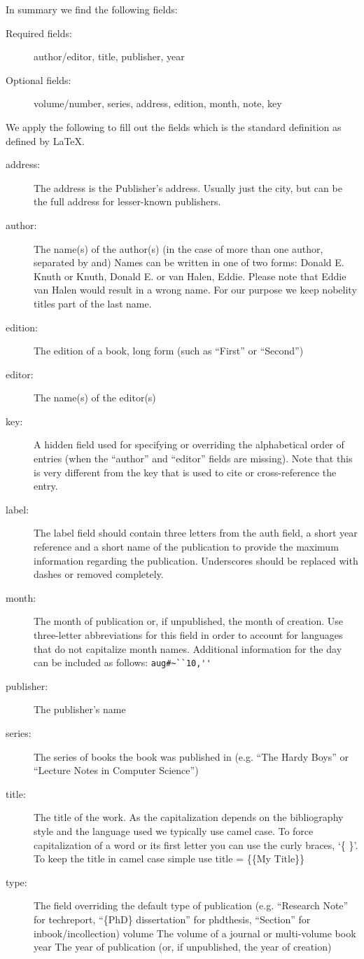 In summary we find the following fields:

\begin{description}
\item[Required fields:]
author/editor, title, publisher, year
\item[Optional fields:]
volume/number, series, address, edition, month, note, key
\end{description}

We apply the following to fill out the fields which is the standard
definition as defined by \LaTeX.

\begin{description}
\item[address:]
The address is the Publisher's address. Usually just the city, but can
be the full address for lesser-known publishers.
\item[author:]
The name(s) of the author(s) (in the case of more than one author,
separated by and) Names can be written in one of two forms: Donald E.
Knuth or Knuth, Donald E. or van Halen, Eddie. Please note that Eddie
van Halen would result in a wrong name. For our purpose we keep nobelity
titles part of the last name.
\item[edition:]
The edition of a book, long form (such as ``First'' or ``Second'')
\item[editor:]
The name(s) of the editor(s)
\item[key:]
A hidden field used for specifying or overriding the alphabetical order
of entries (when the ``author'' and ``editor'' fields are missing). Note
that this is very different from the key that is used to cite or
cross-reference the entry.
\item[label:]
The label field should contain three letters from the auth field, a
short year reference and a short name of the publication to provide the
maximum information regarding the publication. Underscores should be
replaced with dashes or removed completely.
\item[month:]
The month of publication or, if unpublished, the month of creation. Use
three-letter abbreviations for this field in order to account for
languages that do not capitalize month names. Additional information for
the day can be included as follows: \verb|aug#~``10,''|
\item[publisher:]
The publisher's name
\item[series:]
The series of books the book was published in (e.g. ``The Hardy Boys''
or ``Lecture Notes in Computer Science'')
\item[title:]
The title of the work. As the capitalization depends on the bibliography
style and the language used we typically use camel case. To force
capitalization of a word or its first letter you can use the curly
braces, `\{ \}'. To keep the title in camel case simple use title =
\{\{My Title\}\}
\item[type:]
The field overriding the default type of publication (e.g. ``Research
Note'' for techreport, ``\{PhD\} dissertation'' for phdthesis,
``Section'' for inbook/incollection) volume The volume of a journal or
multi-volume book year The year of publication (or, if unpublished, the
year of creation)
\end{description}

